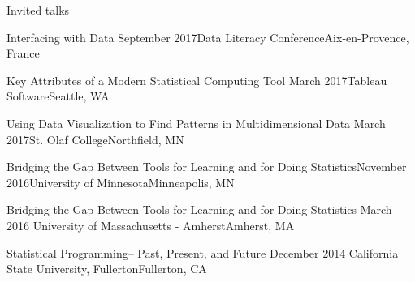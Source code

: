 \documentclass{resume} %
\begin{document}
\begin{rSection}{Invited talks}

\begin{sSubsection}{Interfacing with Data}{ }{September 2017}{Data Literacy Conference}{Aix-en-Provence, France}
\end{sSubsection}

\begin{sSubsection}{Key Attributes of a Modern Statistical Computing Tool}{ }{March 2017}{Tableau Software}{Seattle, WA}
\end{sSubsection}

\begin{sSubsection}{Using Data Visualization to Find Patterns in Multidimensional Data}{ }{March 2017}{St. Olaf College}{Northfield, MN}
\end{sSubsection}

\begin{sSubsection}{Bridging the Gap Between Tools for Learning and for Doing Statistics}{}{November 2016}{University of Minnesota}{Minneapolis, MN}
\end{sSubsection}

\begin{sSubsection}{Bridging the Gap Between Tools for Learning and for Doing Statistics}{ }{March 2016 }{University of Massachusetts - Amherst}{Amherst, MA}
\end{sSubsection}

\begin{sSubsection}{Statistical Programming-- Past, Present, and Future}{ }{December 2014 }{California State University, Fullerton}{Fullerton, CA}
\end{sSubsection}

\end{rSection}
\end{document}
